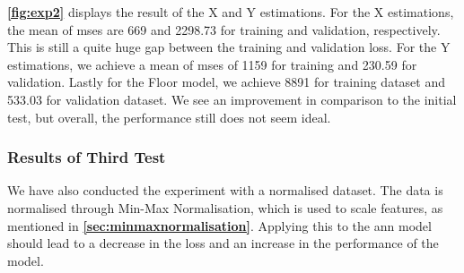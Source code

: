 \textbf{\autoref{fig:exp2}} displays the result of the X and Y estimations. For the X estimations, the mean of \gls{mse}s are 669 and 2298.73 for training and validation, respectively. This is still a quite huge gap between the training and validation loss. For the Y estimations, we achieve a mean of \gls{mse}s of 1159 for training and 230.59 for validation.  Lastly for the Floor model, we achieve 8891 for training dataset and 533.03 for validation dataset. We see an improvement in comparison to the initial test, but overall, the performance still does not seem ideal.


\subsubsection{Results of Third Test}
We have also conducted the experiment with a normalised dataset. The data is normalised through Min-Max Normalisation, which is used to scale features, as mentioned in \textbf{\autoref{sec:minmaxnormalisation}}. Applying this to the \gls{ann} model should lead to a decrease in the loss and an increase in the performance of the model.


